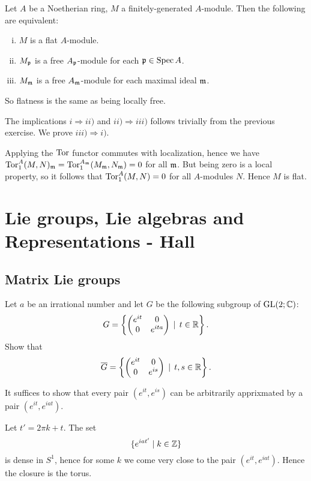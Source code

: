 \documentclass[11pt, english]{article}
\begin{document}
\begin{exc}[Exercise 16]
 Let $A$ be a Noetherian ring, $M$ a finitely-generated $A$-module. Then the following are equivalent:
 \begin{enumerate}[i)]
 \item $M$ is a flat $A$-module.
\item $M_{\mathfrak{p}}$ is a free $A_{\mathfrak{p}}$-module for each $\mathfrak{p} \in \operatorname{Spec} A$.
\item $M_{\mathfrak{m}}$ is a free $A_{\mathfrak{m}}$-module for each maximal ideal $\mathfrak{m}$.
 \end{enumerate}

So flatness is the same as being locally free.
\end{exc}
\begin{sol}
 The implications $i \Rightarrow ii)$ and $ii) \Rightarrow iii)$ follows trivially from the previous exercise. We prove $iii) \Rightarrow i)$. 

Applying the $\operatorname{\mathrm{Tor}}$ functor commutes with localization, hence we have $\operatorname{\mathrm{Tor}}_1^A(M,N)_{\mathfrak{m}} = \operatorname{\mathrm{Tor}}_1^{A_{\mathfrak{m}}}(M_{\mathfrak{m}}, N_{\mathfrak{m}})=0$ for all $\mathfrak{m}$. But being zero is a local property, so it follows that $\operatorname{\mathrm{Tor}}_1^A(M,N)=0$ for all $A$-modules $N$. Hence $M$ is flat.
\end{sol}


\section{Lie groups, Lie algebras and Representations - Hall}

\subsection{Matrix Lie groups}

\begin{exc}
Let $a$ be an irrational number and let $G$ be the following subgroup of $\operatorname{GL}(2; \mathbb{C})$:
$$
G = 
\left\{
\begin{pmatrix}
e^{it} & 0 \\
0 & e^{ita} 
\end{pmatrix}
\, \mid  \, t \in \mathbb{R} \right\}.
$$
Show that
$$
\overline G = \left\{
\begin{pmatrix}
e^{it} & 0 \\
0 & e^{is} 
\end{pmatrix}
\, \mid  \, t,s  \in \mathbb{R} \right\}.
$$
\end{exc}
\begin{sol}
It suffices to show that every pair $(e^{it},e^{is})$ can be arbitrarily apprixmated by a pair $(e^{it},e^{iat})$. 

Let $t' = 2\pi k + t$. The set 
$$
\{ e^{iat'} \mid k \in \mathbb{Z} \} 
$$
is dense in $S^1$, hence for some $k$ we come very close to the pair $(e^{it},e^{iat})$. Hence the closure is the torus.
\end{sol}
\end{document}
